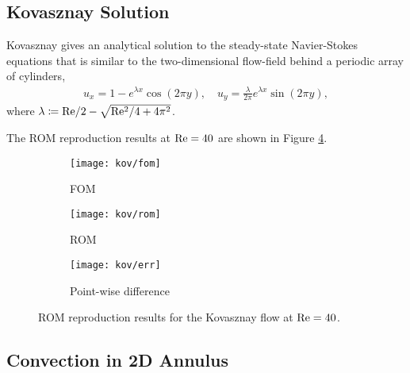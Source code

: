 \subsection{Kovasznay Solution}

\noindent
Kovasznay \cite{kov48} gives an analytical solution to the steady-state
Navier-Stokes equations that is similar to the two-dimensional flow-field
behind a periodic array of cylinders,
\begin{align}
   u_x = 1-e^{\lambda x} \cos(2 \pi y), \quad u_y = \frac{\lambda}{2\pi}
   e^{\lambda x} \sin(2 \pi y),
\end{align}
where $\lambda \coloneqq \rm Re/2 - \sqrt{\rm Re^2/4 + 4\pi^2}$. 

The ROM reproduction results at $\rm Re=40$ are shown in Figure \ref{fig:3}.
\begin{figure}[!h]
     \centering
     \begin{subfigure}[b]{0.3\textwidth}
         \centering
         \texttt{[image: kov/fom]}
         \caption{FOM}
         \label{fig:3_a}
     \end{subfigure}
     \begin{subfigure}[b]{0.3\textwidth}
         \centering
         \texttt{[image: kov/rom]}
         \caption{ROM}
         \label{fig:3_b}
     \end{subfigure}
     \begin{subfigure}[b]{0.3\textwidth}
         \centering
         \texttt{[image: kov/err]}
         \caption{Point-wise difference}
         \label{fig:3_c}
     \end{subfigure}
     \caption{ROM reproduction results for the Kovasznay flow \cite{kov48} 
at $\rm Re=40$.} \label{fig:3}
\end{figure}

\subsection{Convection in 2D Annulus}

